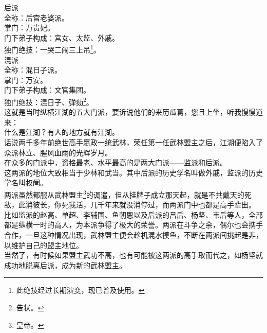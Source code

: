 \begin{multicols}{\theparacolNo}
后派\\

全称：后宫老婆派。\\

掌门：万贵妃。\\

门下弟子构成：宫女、太监、外戚。\\

独门绝技：一哭二闹三上吊\footnote{此绝技经过长期演变，现已普及使用。}。\\

混派\\

全称：混日子派。\\

掌门：万安。\\

门下弟子构成：文官集团。\\

独门绝技：混日子、弹劾\footnote{告状。}。\\

这就是当时纵横江湖的五大门派，要诉说他们的来历瓜葛，您且上坐，听我慢慢道来：\\

什么是江湖？有人的地方就有江湖。\\

话说两千多年前绝世高手嬴政一统武林，荣任第一任武林盟主之后，江湖便陷入了众派林立、腥风血雨的光辉岁月。\\

在众多的门派中，资格最老、水平最高的是两大门派——监派和后派。\\

这两派的地位大致相当于少林和武当。其中后派的历史学名叫做外戚，监派的历史学名叫权阉。\\

两派虽然都服从武林盟主\footnote{皇帝。}的调遣，但从挂牌子成立那天起，就是不共戴天的死敌，此消彼长，你死我活，几千年来就没消停过，而两派门中也都是高手辈出。\\

比如监派的赵高、单超、李辅国、鱼朝恩以及后派的吕后、杨坚、韦后等人，全部都是纵横一时的高人，为本派争得了极大的荣誉。两派在斗争之余，偶尔也会携手合作，一旦这种情况出现，武林盟主便会趁机混水摸鱼，不断在两派间挑起是非，以维护自己的盟主地位。\\

当然了，有时候如果盟主武功不高，也有可能被这两派的高手取而代之，如杨坚就成功地脱离后派，成为新的武林盟主。\\


\end{multicols}

